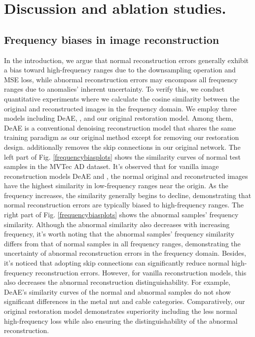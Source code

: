 \documentclass[5p, twocolumn]{elsarticle}[draft]
\begin{document}
 \section{Discussion and ablation studies.}
\subsection{Frequency biases in image reconstruction}
In the introduction, we argue that normal reconstruction errors generally exhibit a bias toward high-frequency ranges due to the downsampling operation and MSE loss, while abnormal reconstruction errors may encompass all frequency ranges due to anomalies' inherent uncertainty. To verify this, we conduct quantitative experiments where we calculate the cosine similarity between the original and reconstructed images in the frequency domain. We employ three models including DeAE, , and our original restoration model. Among them, DeAE is a conventional denoising reconstruction model that shares the same training paradigm as our original method except for removing our restoration design.  additionally removes the skip connections in our original network. The left part of Fig. \ref{frequencybiasplots} shows the similarity curves of normal test samples in the MVTec AD dataset. It's observed that for vanilla image reconstruction models DeAE and , the normal original and reconstructed images have the highest similarity in low-frequency ranges near the origin. As the frequency increases, the similarity generally begins to decline, demonstrating that normal reconstruction errors are typically biased to high-frequency ranges. The right part of Fig. \ref{frequencybiasplots} shows the abnormal samples' frequency similarity. Although the abnormal similarity also decreases with increasing frequency, it's worth noting that the abnormal samples' frequency similarity differs from that of normal samples in all frequency ranges, demonstrating the uncertainty of abnormal reconstruction errors in the frequency domain. Besides, it's noticed that adopting skip connections can significantly reduce normal high-frequency reconstruction errors. However, for vanilla reconstruction models, this also decreases the abnormal reconstruction distinguishability. For example, DeAE's similarity curves of the normal and abnormal samples do not show significant differences in the metal nut and cable categories. Comparatively, our original restoration model demonstrates superiority including the less normal high-frequency loss while also ensuring the distinguishability of the abnormal reconstruction.     
\end{document}

